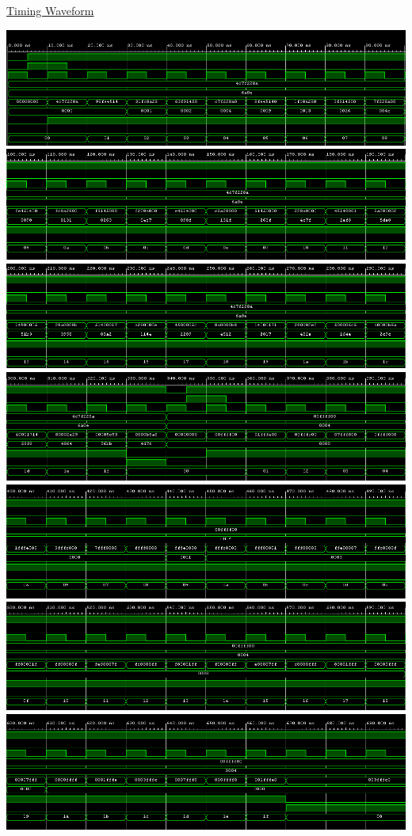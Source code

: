 \documentclass[11pt]{article}
\begin{document}
\begin{center}
    \underline{Timing Waveform}

    \includegraphics[width = 1\textwidth]{0-100.png}
    \includegraphics[width = 1\textwidth]{100-200.png}
    \includegraphics[width = 1\textwidth]{200-300.png}
    \includegraphics[width = 1\textwidth]{300-400.png}
    \includegraphics[width = 1\textwidth]{400-500.png}
    \includegraphics[width = 1\textwidth]{500-600.png}
    \includegraphics[width = 1\textwidth]{600-700.png}
    

\end{center}
\end{document}
